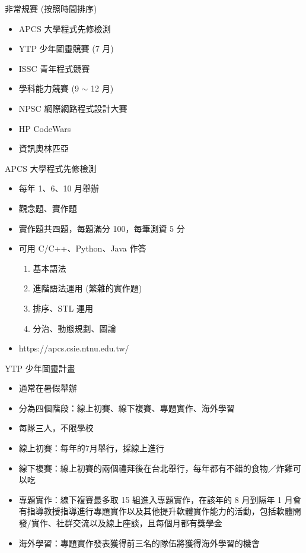 \documentclass[aspectratio=169]{beamer}
\begin{document}
	\begin{frame}{非常規賽 (按照時間排序)}
		\begin{itemize}
			\item APCS 大學程式先修檢測
			\item YTP 少年圖靈競賽 (7 月)
			\item ISSC 青年程式競賽
			\item 學科能力競賽 (9 $\sim$ 12 月)
			\item NPSC 網際網路程式設計大賽
			\item HP CodeWars
			\item 資訊奧林匹亞
		\end{itemize}
	\end{frame}

	\begin{frame}{APCS 大學程式先修檢測}
		\begin{itemize}
			\item 每年 1、6、10 月舉辦
			\item 觀念題、實作題
			\item 實作題共四題，每題滿分 100，每筆測資 5 分
			\item 可用 C/C++、Python、Java 作答
			\begin{enumerate}
				\item 基本語法
				\item 進階語法運用 (繁雜的實作題)
				\item 排序、STL 運用
				\item 分治、動態規劃、圖論
			\end{enumerate}
			\item https://apcs.csie.ntnu.edu.tw/
		\end{itemize}
	\end{frame}

	\begin{frame}{YTP 少年圖靈計畫}
		\begin{itemize}
			\item 通常在暑假舉辦
			\item 分為四個階段：線上初賽、線下複賽、專題實作、海外學習
			\item 每隊三人，不限學校
			\item 線上初賽：每年的7月舉行，採線上進行
			\item 線下複賽：線上初賽的兩個禮拜後在台北舉行，每年都有不錯的食物／炸雞可以吃
			\item 專題實作：線下複賽最多取 15 組進入專題實作，在該年的 8 月到隔年 1 月會有指導教授指導進行專題實作以及其他提升軟體實作能力的活動，包括軟體開發/實作、社群交流以及線上座談，且每個月都有獎學金
			\item 海外學習：專題實作發表獲得前三名的隊伍將獲得海外學習的機會
		\end{itemize}
	\end{frame}
\end{document}
